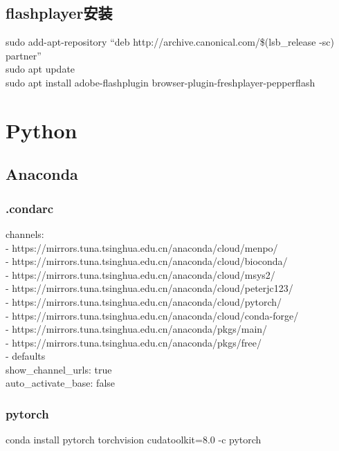\documentclass{ctexart}
\begin{document}
	\subsection{flashplayer安装}
		\indent sudo add-apt-repository ``deb http://archive.canonical.com/\$(lsb\_release -sc) partner''\\
		\indent sudo apt update	\\
		\indent sudo apt install adobe-flashplugin browser-plugin-freshplayer-pepperflash	\\

	\section{Python}
	\subsection{Anaconda}
	\subsubsection{.condarc}
		\noindent channels:	\\
		\indent - https://mirrors.tuna.tsinghua.edu.cn/anaconda/cloud/menpo/	\\
		\indent - https://mirrors.tuna.tsinghua.edu.cn/anaconda/cloud/bioconda/	\\
		\indent - https://mirrors.tuna.tsinghua.edu.cn/anaconda/cloud/msys2/	\\
		\indent - https://mirrors.tuna.tsinghua.edu.cn/anaconda/cloud/peterjc123/	\\
		\indent - https://mirrors.tuna.tsinghua.edu.cn/anaconda/cloud/pytorch/	\\
		\indent - https://mirrors.tuna.tsinghua.edu.cn/anaconda/cloud/conda-forge/	\\
		\indent - https://mirrors.tuna.tsinghua.edu.cn/anaconda/pkgs/main/	\\
		\indent - https://mirrors.tuna.tsinghua.edu.cn/anaconda/pkgs/free/	\\
		- defaults	\\
		\indent show\_channel\_urls: true	\\
		\indent auto\_activate\_base: false	\\
	\subsubsection{pytorch}
		conda install pytorch torchvision cudatoolkit=8.0 -c pytorch
\end{document}
